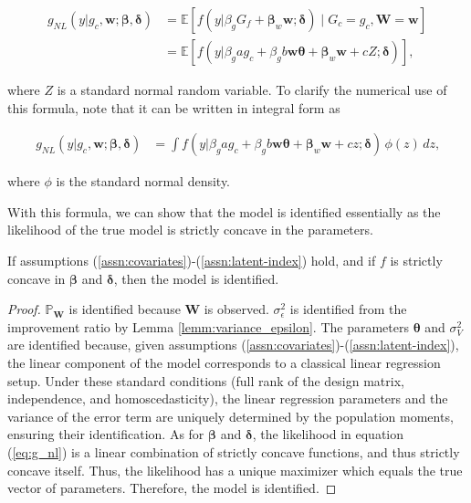 \documentclass[12pt]{article}
\begin{document}
\begin{align*}
    g_{NL}(y | g_c, \boldsymbol{w}; \boldsymbol{\beta}, \boldsymbol{\delta}) 
    &= \mathbb{E} \left[ 
        f\left( y | \beta_g G_f + \boldsymbol{\beta}_w \boldsymbol{w}; \boldsymbol{\delta} \right) 
        \mid
        G_c = g_c, \boldsymbol W = \boldsymbol w
    \right] \\
    &= \mathbb{E} \left[ 
        f\left( y |
        \beta_g a g_c +
        \beta_g b \boldsymbol{w} \boldsymbol{\theta} +
        \boldsymbol{\beta}_w \boldsymbol{w} +
        c Z;
        \boldsymbol{\delta} \right) 
    \right]\text{,}
\end{align*}

where $Z$ is a standard normal random variable. To clarify the numerical use of this formula, note that it can be written in integral form as

\begin{align}
    \label{eq:g_nl}
    g_{NL}(y | g_c, \boldsymbol{w}; \boldsymbol{\beta}, \boldsymbol{\delta}) 
    &= \int f\left( y | \beta_g a g_c + \beta_g b \boldsymbol{w} \boldsymbol{\theta} + \boldsymbol{\beta}_w \boldsymbol{w} + c z; \boldsymbol{\delta} \right) \, \phi(z) \, dz\text{,}
\end{align}

where $\phi$ is the standard normal density.

With this formula, we can show that the model is identified essentially as the likelihood of the true model is strictly concave in the parameters.

\begin{theorem}[identification]
    If assumptions (\ref{assn:covariates})-(\ref{assn:latent-index}) hold, and if $f$ is strictly concave in $\boldsymbol{\beta}$ and $\boldsymbol{\delta}$, then the model is identified.
    \label{thm:identification}
\end{theorem}
\begin{proof}
    $\mathbb P _ {\boldsymbol{W}}$ is identified because $\boldsymbol{W}$ is observed. $\sigma^2_\epsilon$ is identified from the improvement ratio by Lemma \ref{lemm:variance_epsilon}. The parameters \(\boldsymbol{\theta}\) and \(\sigma^2_V\) are identified because, given assumptions (\ref{assn:covariates})-(\ref{assn:latent-index}), the linear component of the model corresponds to a classical linear regression setup. Under these standard conditions (full rank of the design matrix, independence, and homoscedasticity), the linear regression parameters and the variance of the error term are uniquely determined by the population moments, ensuring their identification. As for $\boldsymbol{\beta}$ and $\boldsymbol{\delta}$, the likelihood in equation (\ref{eq:g_nl}) is a linear combination of strictly concave functions, and thus strictly concave itself. Thus, the likelihood has a unique maximizer which equals the true vector of parameters. Therefore, the model is identified.
\end{proof}
\end{document}
